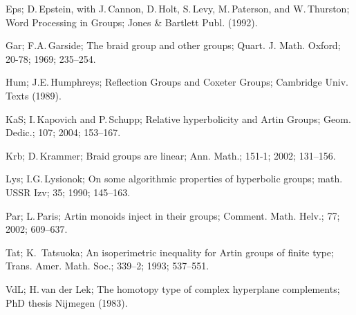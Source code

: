 \documentclass{amsart}
\numberwithin{equation}{section}
\theoremstyle{plain}
\theoremstyle{definition}
\begin{document}
\begin{thebibliography}{99}
\Ref Eps; D.\,Epstein, with J.\,Cannon, D.\,Holt, S.\,Levy, M.\,Paterson, and W.\,Thurston; Word Processing in Groups; Jones \& Bartlett Publ. (1992).

\Reff Gar; F.A.\,Garside; The braid group and other groups; Quart. J. Math. Oxford; 20-78; 1969; 235--254.

\Ref Hum; J.E.\,Humphreys; Reflection Groups and Coxeter Groups; Cambridge Univ. Texts (1989).

\Reff KaS; I.\,Kapovich and P.\,Schupp; Relative hyperbolicity and Artin Groups; Geom. Dedic.; 107; 2004; 153--167. 

\Reff Krb; D.\,Krammer; Braid groups are linear; Ann. Math.; 151-1; 2002; 131--156.

\Reff Lys; I.G.\,Lysionok; On some algorithmic properties of hyperbolic groups; math. USSR Izv; 35; 1990; 145--163. 
 
\Reff Par; L.\,Paris; Artin monoids inject in their groups; Comment. Math. Helv.; 77; 2002; 609--637. 

\Reff Tat; K.~Tatsuoka; An isoperimetric inequality for
Artin groups of finite type; Trans. Amer. Math. Soc.; 339--2;
1993; 537--551. 

\Ref VdL; H.\,van der Lek; The homotopy type of complex hyperplane complements; PhD thesis Nijmegen (1983).

\end{thebibliography}
\end{document}
